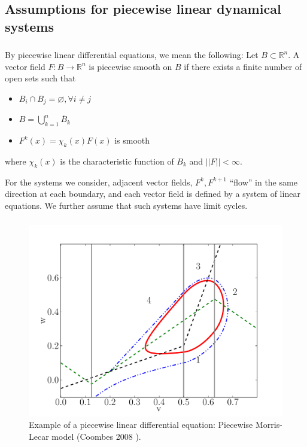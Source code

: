 \documentclass{beamer}
\begin{document}
\subsection{Assumptions for piecewise linear dynamical systems}
\begin{frame}
\frametitle{\insertsection}
  \framesubtitle{\insertsubsection}

   By piecewise linear differential equations, we mean the following: Let $B \subset \mathbb{R}^n$.  A vector field $F:B \rightarrow \mathbb{R}^n$ is piecewise smooth on $B$ if there exists a finite number of open sets such that
   \begin{itemize}
    \item $B_i \cap B_j = \varnothing, \forall i \neq j$
    \item $B = \bigcup_{k=1}^n \overline{B}_k$
    \item $F^k(x) = \chi_k(x) F(x)$ is smooth
   \end{itemize}
  where $\chi_k(x)$ is the characteristic function of $B_k$ and $||F|| < \infty$.
   
   For the systems we consider, adjacent vector fields, $F^k, F^{k+1}$ ``flow'' in the same direction at each boundary, and each vector field is defined by a system of linear equations.  We further assume that such systems have limit cycles.
\end{frame}


\begin{frame}
\begin{figure}
\frametitle{\insertsection}
  \framesubtitle{\insertsubsection}
 \includegraphics[width=.8\textwidth]{pml_fig.pdf}
 \caption{Example of a piecewise linear differential equation: Piecewise Morris-Lecar model (Coombes 2008 \cite{Coombes:2008:SIADS}).}
\end{figure}
\end{frame}
\end{document}
